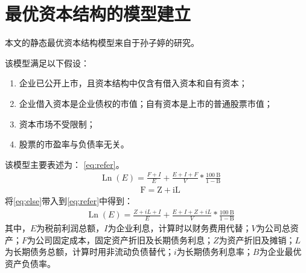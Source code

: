 \section{最优资本结构的模型建立}
本文的静态最优资本结构模型来自于孙子婷的研究\cite{Sun2020}。

该模型满足以下假设：
\begin{enumerate}[label=(\arabic*)]
    \item 企业已公开上市，且资本结构中仅含有借入资本和自有资本；
    \item 企业借入资本是企业债权的市值；自有资本是上市的普通股票市值；
    \item 资本市场不受限制；
    \item 股票的市盈率与负债率无关。
\end{enumerate}
该模型主要表述为：
\eqref{eq:refer}。
\begin{equation}
\begin{aligned}
& \operatorname{Ln}(E)=\frac{F+I}{E}+\frac{E+I+F}{V} * \frac{100 \mathrm{~B}}{1-\mathrm{B}} 
  \label{eq:refer}
\end{aligned}
\end{equation}
\begin{equation}
\begin{aligned}
& \mathrm{F}=\mathrm{Z}+\mathrm{iL}
\label{eq:else}
\end{aligned}
\end{equation}
将\eqref{eq:else}带入到\eqref{eq:refer}中得到：
\begin{equation}
\begin{aligned}
& \operatorname{Ln}(E)=\frac{Z+iL+I}{E}+\frac{E+I+Z+iL}{V} * \frac{100 \mathrm{~B}}{1-\mathrm{B}} 
  \label{eq:main}
\end{aligned}
\end{equation}
其中，$E$为税前利润总额，$I$为企业利息，计算时以财务费用代替；$V$为公司总资产；$F$为公司固定成本，固定资产折旧及长期债务利息；$Z$为资产折旧及摊销；$L$为长期债务总额，计算时用非流动负债替代；$i$为长期债务利息率；$B$为企业最优资产负债率。
